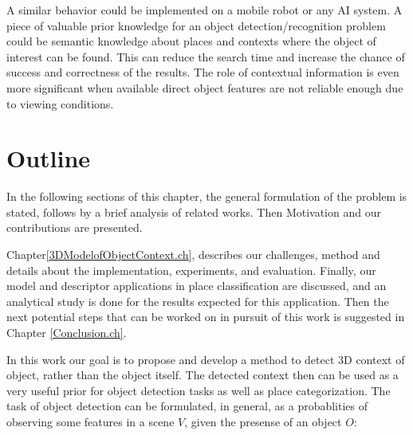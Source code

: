 A similar behavior could be implemented on a mobile robot or any AI system. A piece of valuable prior knowledge for an object detection/recognition
problem could be semantic knowledge about places and contexts where the object of interest can be found. This can reduce the search time and increase the chance of success and correctness of the results. The role of
contextual information is even more significant when available direct object features are not reliable enough due to viewing conditions. 


\section {Outline}
\label{Outline.sec}

In the following sections of this chapter, the general formulation of the problem is stated, follows by a brief analysis of related works. Then Motivation and our contributions are presented.


Chapter\ref{3DModelofObjectContext.ch}, describes our challenges, method and details about the implementation, experiments, and evaluation. 
Finally, our model and descriptor applications in place classification are discussed, and an analytical study is done for the results expected for this application. Then the next potential steps that can be worked on in pursuit of this work is suggested in Chapter \ref{Conclusion.ch}.



In this work our goal is to propose and develop a method to detect 3D context of object, rather than the object itself. The detected context then can be used as a very useful prior for object detection tasks as well as place categorization. The task of object detection can be formulated, in general, as a probablities of observing some features in a scene $V$, given the presense of an object $O$:

